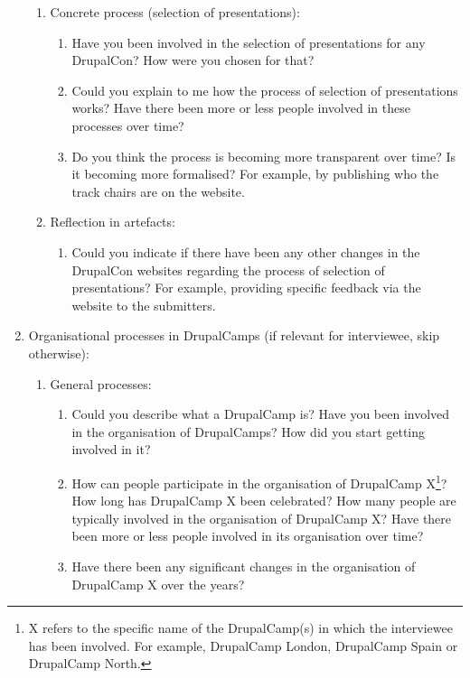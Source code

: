 \begin{enumerate}
\begin{enumerate}
			\item Concrete process (selection of presentations):
			\begin{enumerate}			
				\item Have you been involved in the selection of presentations for any DrupalCon? How were you chosen for that?
				\item Could you explain to me how the process of selection of presentations works? Have there been more or less people involved in these processes over time?
				\item Do you think the process is becoming more transparent over time? Is it becoming more formalised? For example, by publishing who the track chairs are on the website.
			\end{enumerate}	

			\item Reflection in artefacts:
			\begin{enumerate}				
			\item Could you indicate if there have been any other changes in the DrupalCon websites regarding the process of selection of presentations? For example, providing specific feedback via the website to the submitters.
			\end{enumerate}
		\end{enumerate}
		
		
	\item Organisational processes in DrupalCamps (if relevant for interviewee, skip otherwise):
		\begin{enumerate}

			\item General processes:
			\begin{enumerate}		
				\item Could you describe what a DrupalCamp is? Have you been involved in the organisation of DrupalCamps? How did you start getting involved in it?
				\item How can people participate in the organisation of DrupalCamp X\footnote{X refers to the specific name of the DrupalCamp(s) in which the interviewee has been involved. For example, DrupalCamp London, DrupalCamp Spain or DrupalCamp North.}? How long has DrupalCamp X been celebrated? How many people are typically involved in the organisation of DrupalCamp X? Have there been more or less people involved in its organisation over time?
				\item Have there been any significant changes in the organisation of DrupalCamp X over the years?
			\end{enumerate}			
	

\end{enumerate}
\end{enumerate}

